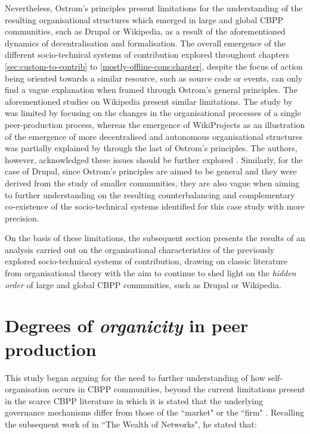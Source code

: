 Nevertheless, Ostrom's principles present limitations for the understanding of the resulting organisational structures which emerged in large and global CBPP communities, such as Drupal or Wikipedia, as a result of the aforementioned dynamics of decentralisation and formalisation. The overall emergence of the different socio-technical systems of contribution explored throughout chapters \ref{sec:custom-to-contrib} to \ref{mostly-offline-cons:chapter}, despite the focus of action being oriented towards a similar resource, such as source code or events, can only find a vague explanation when framed through Ostrom's general principles. The aforementioned studies on Wikipedia present similar limitations. The study by \textcite{viegas2007hidden} was limited by focusing on the changes in the organisational processes of a single peer-production process, whereas the emergence of WikiProjects as an illustration of the emergence of more decentralised and autonomous organisational structures was partially explained by \textcite{forte2009decentralization} through the last of Ostrom's principles. The authors, however, acknowledged these issues should be further explored \parencite[70-71]{forte2009decentralization}. Similarly, for the case of Drupal, since Ostrom's principles are aimed to be general and they were derived from the study of smaller communities, they are also vague when aiming to further understanding on the resulting counterbalancing and complementary co-existence of the socio-technical systems identified for this case study with more precision.

On the basis of these limitations, the subsequent section presents the results of an analysis carried out on the organisational characteristics of the previously explored socio-technical systems of contribution, drawing on classic literature from organisational theory with the aim to continue to shed light on the \textit{hidden order} \parencite{viegas2007hidden} of large and global CBPP communities, such as Drupal or Wikipedia.

\section{Degrees of \textit{organicity} in peer production}
\label{sec:levels-organicity}

This study began arguing for the need to further understanding of how self-organisation occurs in CBPP communities, beyond the current limitations present in the scarce CBPP literature in which it is stated that the underlying governance mechanisms differ from those of the ``market" or the ``firm" \parencite{Benkler2002}. Recalling the subsequent work of \textcite[61]{benkler2006wealth} in ``The Wealth of Networks", he stated that:

